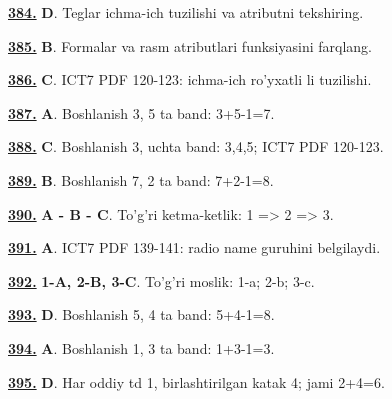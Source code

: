 \documentclass[10pt,a4paper,oneside]{article}
\begin{document}
\par\vspace{3mm}
\noindent\hyperlink{q384}{\textbf{384.}} \textbf{D}.  Teglar ichma-ich tuzilishi va atributni tekshiring.
\par\vspace{3mm}
\noindent\hyperlink{q385}{\textbf{385.}} \textbf{B}.  Formalar va rasm atributlari funksiyasini farqlang.
\par\vspace{3mm}
\noindent\hyperlink{q386}{\textbf{386.}} \textbf{C}.  ICT7 PDF 120-123: ichma-ich ro'yxatli li tuzilishi.
\par\vspace{3mm}
\noindent\hyperlink{q387}{\textbf{387.}} \textbf{A}.  Boshlanish 3, 5 ta band: 3+5-1=7.
\par\vspace{3mm}
\noindent\hyperlink{q388}{\textbf{388.}} \textbf{C}.  Boshlanish 3, uchta band: 3,4,5; ICT7 PDF 120-123.
\par\vspace{3mm}
\noindent\hyperlink{q389}{\textbf{389.}} \textbf{B}.  Boshlanish 7, 2 ta band: 7+2-1=8.
\par\vspace{3mm}
\noindent\hyperlink{q390}{\textbf{390.}} \textbf{A - B - C}.  To'g'ri ketma-ketlik: 1 =\textgreater{} 2 =\textgreater{} 3.
\par\vspace{3mm}
\noindent\hyperlink{q391}{\textbf{391.}} \textbf{A}.  ICT7 PDF 139-141: radio name guruhini belgilaydi.
\par\vspace{3mm}
\noindent\hyperlink{q392}{\textbf{392.}} \textbf{1-A, 2-B, 3-C}.  To'g'ri moslik: 1-a; 2-b; 3-c.
\par\vspace{3mm}
\noindent\hyperlink{q393}{\textbf{393.}} \textbf{D}.  Boshlanish 5, 4 ta band: 5+4-1=8.
\par\vspace{3mm}
\noindent\hyperlink{q394}{\textbf{394.}} \textbf{A}.  Boshlanish 1, 3 ta band: 1+3-1=3.
\par\vspace{3mm}
\noindent\hyperlink{q395}{\textbf{395.}} \textbf{D}.  Har oddiy td 1, birlashtirilgan katak 4; jami 2+4=6.
\end{document}
